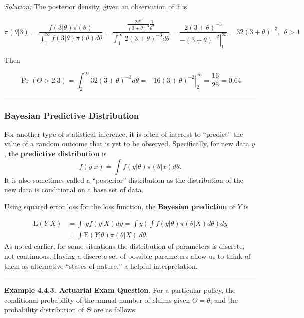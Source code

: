 \documentclass[]{book}
\theoremstyle{definition}
\theoremstyle{definition}
\theoremstyle{definition}
\theoremstyle{remark}
\begin{document}
\hypertarget{toggleExampleSelect.4.2}{}
\emph{Solution:} The posterior density, given an observation of 3 is

\[\pi(\theta|3) =  \frac{f(3|\theta)\pi(\theta)}{\int_1^\infty f(3|\theta)\pi(\theta)d\theta} = 
\frac{\frac{2\theta^2}{(3+\theta)^3}\frac{1}{\theta^2}}{\int_1^\infty 2(3+\theta)^{-3} d\theta} = 
\frac{2(3+\theta)^{-3}}{\left. -(3+\theta)^{-2}\right|_1^\infty} = 32(3+\theta)^{-3}, \ \ \theta > 1\]

Then

\[\Pr(\Theta>2|3) = \int_2^\infty 32(3+\theta)^{-3}d\theta = \left. -16(3+\theta)^{-2} \right|_2^\infty = \frac{16}{25} = 0.64\]

\begin{center}\rule{0.5\linewidth}{\linethickness}\end{center}

\subsubsection{Bayesian Predictive
Distribution}\label{bayesian-predictive-distribution}

For another type of statistical inference, it is often of interest to
``predict'' the value of a random outcome that is yet to be observed.
Specifically, for new data \(y\), the \textbf{predictive distribution}
is \[f(y|x) = \int f(y|\theta) \pi(\theta|x) d\theta .\] It is also
sometimes called a ``posterior'' distribution as the distribution of the
new data is conditional on a base set of data.

Using squared error loss for the loss function, the \textbf{Bayesian
prediction} of \(Y\) is

\[
\begin{aligned}
\mathrm{E}(Y|X) &=  \int ~y f(y|X) dy = \int y \left(\int f(y|\theta) \pi(\theta|X) d\theta \right) dy \\
&=  \int  \mathrm{E}(Y|\theta) \pi(\theta|X) ~d\theta .
\end{aligned}
\] As noted earlier, for some situations the distribution of parameters
is discrete, not continuous. Having a discrete set of possible
parameters allow us to think of them as alternative ``states of
nature,'' a helpful interpretation.

\begin{center}\rule{0.5\linewidth}{\linethickness}\end{center}

\textbf{Example 4.4.3. Actuarial Exam Question.} For a particular
policy, the conditional probability of the annual number of claims given
\(\Theta = \theta\), and the probability distribution of \(\Theta\) are
as follows:
\end{document}

